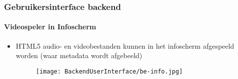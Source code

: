 
\begin{frame}[fragile]
	\frametitle{Gebruikersinterface backend}
	\framesubtitle{Videospeler in Infoscherm}
	\begin{itemize}
		\item HTML5 audio- en videobestanden kunnen in het infoscherm afgespeeld worden
			(waar metadata wordt afgebeeld)
		\begin{figure}
			\texttt{[image: BackendUserInterface/be-info.jpg]}
		\end{figure}

	\end{itemize}

\end{frame}

